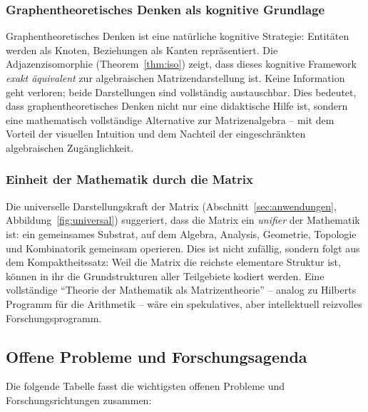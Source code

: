 ﻿\documentclass[12pt, a4paper]{article}
\theoremstyle{definition}
\theoremstyle{remark}
\begin{document}
\subsubsection*{Graphentheoretisches Denken als kognitive Grundlage}

Graphentheoretisches Denken ist eine natürliche kognitive Strategie:
Entitäten werden als Knoten, Beziehungen als Kanten repräsentiert.
Die Adjazenzisomorphie (Theorem~\ref{thm:iso}) zeigt, dass dieses
kognitive Framework \emph{exakt äquivalent} zur algebraischen
Matrizendarstellung ist. Keine Information geht verloren; beide
Darstellungen sind vollständig austauschbar. Dies bedeutet, dass
graphentheoretisches Denken nicht nur eine didaktische Hilfe ist,
sondern eine mathematisch vollständige Alternative zur
Matrizenalgebra -- mit dem Vorteil der visuellen Intuition und dem
Nachteil der eingeschränkten algebraischen Zugänglichkeit.

\subsubsection*{Einheit der Mathematik durch die Matrix}

Die universelle Darstellungskraft der Matrix (Abschnitt~\ref{sec:anwendungen},
Abbildung~\ref{fig:universal}) suggeriert, dass die Matrix ein
\emph{unifier} der Mathematik ist: ein gemeinsames Substrat, auf dem
Algebra, Analysis, Geometrie, Topologie und Kombinatorik gemeinsam
operieren. Dies ist nicht zufällig, sondern folgt aus dem Kompaktheitssatz:
Weil die Matrix die reichste elementare Struktur ist, können in ihr
die Grundstrukturen aller Teilgebiete kodiert werden. Eine vollständige
``Theorie der Mathematik als Matrizentheorie'' -- analog zu Hilberts
Programm für die Arithmetik -- wäre ein spekulatives, aber
intellektuell reizvolles Forschungsprogramm.

\subsection{Offene Probleme und Forschungsagenda}
\label{subsec:agenda}

Die folgende Tabelle fasst die wichtigsten offenen Probleme und
Forschungsrichtungen zusammen:
\end{document}
